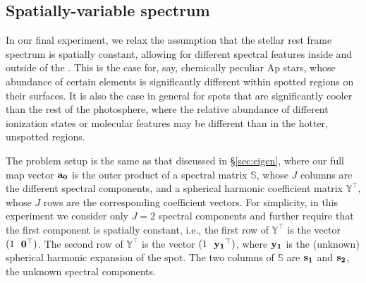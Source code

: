 \documentclass[modern]{aastex62}
\begin{document}
\subsection{Spatially-variable spectrum}
\label{sec:twospec}
%
In our final experiment, we relax the assumption that the stellar
rest frame spectrum is spatially constant, allowing for different
spectral features inside and outside of the \spot. This is the case
for, say, chemically peculiar Ap stars, whose abundance of certain
elements is significantly different within spotted regions on their
surfaces. It is also the case in general for spots that are significantly
cooler than the rest of the photosphere, where the relative abundance
of different ionization states or molecular features may be different
than in the hotter, unspotted regions.

The problem setup is the same as that discussed in \S\ref{sec:eigen}, where
our full map vector ${\mathbf{a_0}}$ is the outer product of a spectral matrix
$\mathbb{S}$, whose $J$ columns are the different spectral components, and
a spherical harmonic coefficient matrix $\mathbb{Y}^\top$, whose $J$ rows
are the corresponding coefficient vectors. For simplicity, in this experiment
we consider only $J = 2$ spectral components and further require that the
first component is spatially constant, i.e., the first row of
$\mathbb{Y}^\top$ is the vector $(1 \quadquad \bvec{0}^\top)$. The second
row of $\mathbb{Y}^\top$ is the vector $(1 \quadquad \bvec{y_1}^\top)$, where
${\mathbf{y_1}}$ is the (unknown) spherical harmonic expansion of the spot. The
two columns of $\mathbb{S}$ are ${\mathbf{s_1}}$ and ${\mathbf{s_2}}$, the unknown
spectral components.
\end{document}
